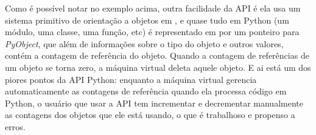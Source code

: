     Como é possível notar no exemplo acima, outra facilidade da API é ela usa um sistema 
    primitivo de orientação a objetos em \C{}, e quase tudo em Python (um módulo, uma 
    classe, uma função, etc) é representado em \C{} por um ponteiro para \emph{PyObject}, 
    que além de informações sobre o tipo do objeto e outros valores, contém a contagem de 
    referência do objeto. Quando a contagem de referências de um objeto se torna zero, a 
    máquina virtual deleta aquele objeto. E ai está um dos piores pontos da API Python: 
    enquanto a máquina virtual gerencia automaticamente as contagens de referência
    quando ela processa código em Python, o usuário que usar a API \C{} tem incrementar e 
    decrementar manualmente as contagens dos objetos que ele está usando, o que é trabalhoso e 
    propenso a erros.
    
    
